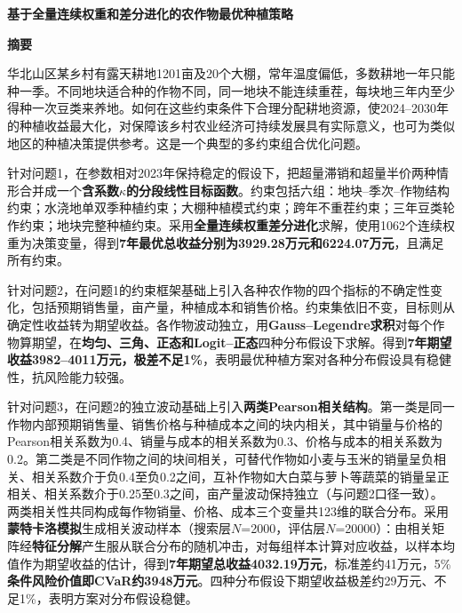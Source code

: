 \documentclass[12pt,a4paper]{article}
\begin{document}
\setcounter{page}{1}

\begin{center}
{\bfseries 基于全量连续权重和差分进化的农作物最优种植策略}

\vspace{2ex}
{\bfseries 摘要}
\end{center}

华北山区某乡村有露天耕地1201亩及20个大棚，常年温度偏低，多数耕地一年只能种一季。不同地块适合种的作物不同，同一地块不能连续重茬，每块地三年内至少得种一次豆类来养地。如何在这些约束条件下合理分配耕地资源，使2024--2030年的种植收益最大化，对保障该乡村农业经济可持续发展具有实际意义，也可为类似地区的种植决策提供参考。这是一个典型的多约束组合优化问题。

针对问题1，在参数相对2023年保持稳定的假设下，把超量滞销和超量半价两种情形合并成一个\textbf{含系数$\kappa$的分段线性目标函数}。约束包括六组：地块--季次--作物结构约束；水浇地单双季种植约束；大棚种植模式约束；跨年不重茬约束；三年豆类轮作约束；地块完整种植约束。采用\textbf{全量连续权重差分进化}求解，使用1062个连续权重为决策变量，得到\textbf{7年最优总收益分别为3929.28万元和6224.07万元}，且满足所有约束。

针对问题2，在问题1的约束框架基础上引入各种农作物的四个指标的不确定性变化，包括预期销售量，亩产量，种植成本和销售价格。约束集依旧不变，目标则从确定性收益转为期望收益。各作物波动独立，用\textbf{Gauss--Legendre求积}对每个作物算期望，在\textbf{均匀、三角、正态和Logit--正态}四种分布假设下求解。得到\textbf{7年期望收益3982--4011万元，极差不足1\%}，表明最优种植方案对各种分布假设具有稳健性，抗风险能力较强。

针对问题3，在问题2的独立波动基础上引入\textbf{两类Pearson相关结构}。第一类是同一作物内部预期销售量、销售价格与种植成本之间的块内相关，其中销量与价格的Pearson相关系数为0.4、销量与成本的相关系数为0.3、价格与成本的相关系数为0.2。第二类是不同作物之间的块间相关，可替代作物如小麦与玉米的销量呈负相关、相关系数介于负0.4至负0.2之间，互补作物如大白菜与萝卜等蔬菜的销量呈正相关、相关系数介于0.25至0.3之间，亩产量波动保持独立（与问题2口径一致）。两类相关性共同构成每作物销量、价格、成本三个变量共123维的联合分布。采用\textbf{蒙特卡洛模拟}生成相关波动样本（搜索层$N$=2000，评估层$N$=20000）：由相关矩阵经\textbf{特征分解}产生服从联合分布的随机冲击，对每组样本计算对应收益，以样本均值作为期望收益的估计，得到\textbf{7年期望总收益4032.19万元}，标准差约41万元，5\%\textbf{条件风险价值即CVaR约3948万元}。四种分布假设下期望收益极差约29万元、不足1\%，表明方案对分布假设稳健。
\end{document}
